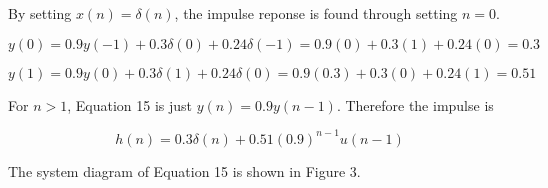 \documentclass[11pt,a4paper]{article}
\begin{document}
By setting $x(n) = \delta(n)$, the impulse reponse is found through setting $n = 0$.

\begin{equation}
    y(0) = 0.9y(-1) + 0.3\delta(0) + 0.24\delta(-1) = 0.9(0) + 0.3(1) + 0.24(0) = 0.3
\end{equation}

\begin{equation}
    y(1) = 0.9y(0) + 0.3\delta(1) + 0.24\delta(0) = 0.9(0.3) + 0.3(0) + 0.24(1) = 0.51
\end{equation}

For $n > 1$, Equation 15 is just $y(n) = 0.9y(n-1)$. Therefore the impulse is

\begin{equation}
    h(n) = 0.3\delta(n) + 0.51(0.9)^{n-1} u(n-1)
\end{equation}

The system diagram of Equation 15 is shown in Figure 3.
\end{document}
